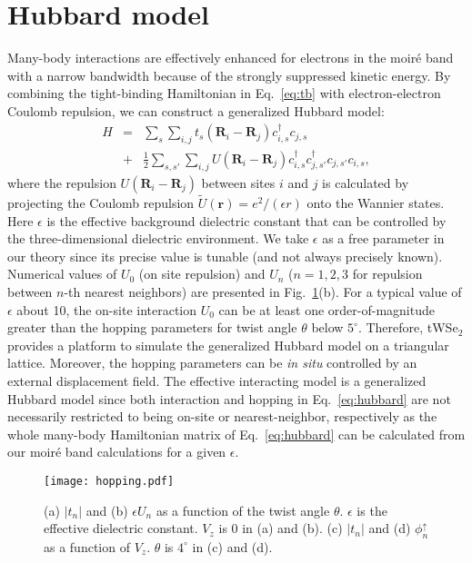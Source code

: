 \documentclass[aps,prx,floatfix,twocolumn]{revtex4-1}
\begin{document}
	
	\section{Hubbard model}\label{sec:hubbard}
	Many-body interactions are effectively enhanced for electrons in the moir\'e band with a narrow bandwidth because of the strongly suppressed kinetic energy. By combining  the tight-binding Hamiltonian in Eq.~\eqref{eq:tb} with electron-electron Coulomb repulsion, we can construct a generalized Hubbard model:
	\begin{eqnarray}\label{eq:hubbard}
	H&=&\sum_{s}\sum_{i,j}^{} t_{s}\left(\bm{R}_i-\bm{R}_j\right) c_{i,s}^\dagger c_{j,s}\nonumber\\
	&+&\frac{1}{2}\sum_{s,s'}\sum_{i,j}U(\bm{R}_i-\bm{R}_j) c_{i,s}^\dagger c_{j,s'}^\dagger c_{j,s'} c_{i,s},
	\end{eqnarray}
	where the repulsion $ U(\bm{R}_i-\bm{R}_j) $ between sites $i$ and $j$ is calculated by projecting the Coulomb repulsion $\tilde{U}(\bm{r})=e^2/(\epsilon r)$ onto the Wannier states. Here $\epsilon$ is the effective background dielectric constant that can be controlled by the three-dimensional dielectric environment. We take $\epsilon$ as a free parameter in our theory since its precise value is tunable (and not always precisely known). Numerical values of $U_0$ (on site repulsion) and $U_n$ ($n=1,2,3$ for repulsion between $n$-th nearest neighbors) are presented in Fig.~\ref{fig:hopping}(b). For a typical value of $\epsilon$ about 10, the on-site interaction $U_0$ can be at least one order-of-magnitude greater than the hopping parameters for twist angle $\theta$ below $5^{\circ}$. Therefore, tWSe$_2$ provides a platform to simulate the generalized Hubbard model on a triangular lattice. Moreover, the hopping parameters can be {\it in situ} controlled by an external displacement field. The effective interacting model is a generalized Hubbard model since both interaction and hopping in Eq.~\eqref{eq:hubbard} are not necessarily restricted to being on-site or nearest-neighbor, respectively as the whole many-body Hamiltonian matrix of Eq.~\eqref{eq:hubbard} can be calculated from our moir\'e band calculations for a given $ \epsilon $.




	\begin{figure}[t]
		\centering
		\texttt{[image: hopping.pdf]}
		\caption{(a) $|t_n|$ and (b) $ \epsilon U_n$ as a function of the twist angle $ \theta $. $\epsilon$ is the effective dielectric constant. $V_z$ is 0 in (a) and (b). (c) $|t_n|$ and (d) $\phi_n^{\uparrow}$ as a function of $V_z$. $\theta$ is $4^{\circ}$ in (c) and (d).}	
		\label{fig:hopping}
	\end{figure}
	
\end{document}
